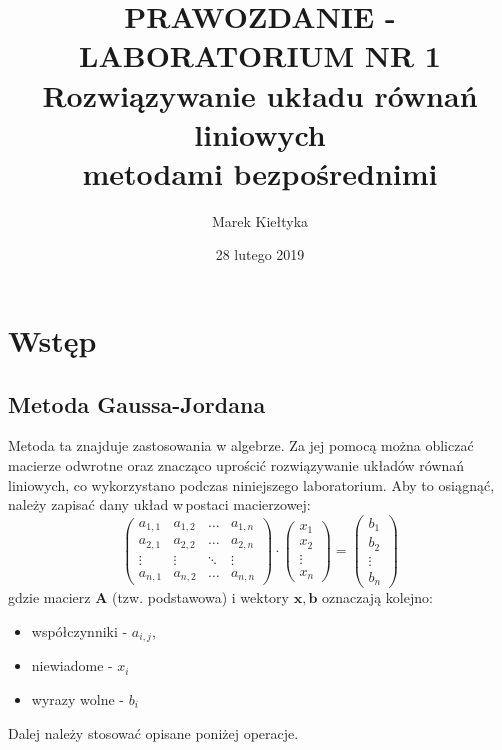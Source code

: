 

\title{\Large\vspace{-2.5cm}{\Huge S}PRAWOZDANIE - LABORATORIUM NR {\Huge1}\\
		\textbf{Rozwiązywanie układu równań liniowych \\metodami bezpośrednimi} } 
\date{\Large28 lutego 2019}
\author{\Large Marek Kiełtyka}


\maketitle

\section{Wstęp}
	
\subsection{Metoda Gaussa-Jordana}

Metoda ta znajduje zastosowania w algebrze. Za jej pomocą można obliczać macierze odwrotne oraz znacząco uprościć rozwiązywanie układów równań liniowych, co wykorzystano podczas niniejszego laboratorium. Aby to osiągnąć, należy zapisać dany układ w\,postaci macierzowej:
\begin{equation}
\begin{pmatrix}
a_{1,1} & a_{1,2}  & \dots  & a_{1,n} \\
a_{2,1} & a_{2,2}  & \dots  & a_{2,n} \\
\vdots & \vdots & \ddots & \vdots \\
a_{n,1} & a_{n,2}  & \dots  & a_{n,n}
\end{pmatrix}
\cdot
\begin{pmatrix}
x_{1} \\
x_{2} \\
\vdots \\
x_{n}
\end{pmatrix}
= 
\begin{pmatrix}
b_{1} \\
b_{2} \\
\vdots \\
b_{n}
\end{pmatrix}
\label{macierzrownan}
\end{equation}
gdzie macierz $ \boldsymbol{A} $ (tzw. podstawowa) i wektory $ \boldsymbol{x}, \boldsymbol{b} $ oznaczają kolejno: \begin{itemize}
	\item współczynniki - $a_{i,j}$,
	\item niewiadome - $x_i$
	\item wyrazy wolne - $b_i$
\end{itemize}
Dalej należy stosować opisane poniżej operacje. 

